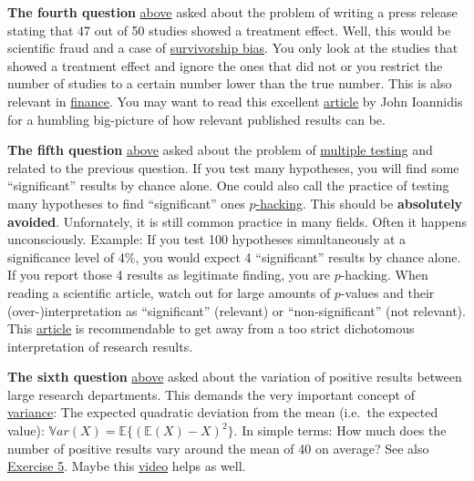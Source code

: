 \documentclass[
]{book}
\begin{document}
\textbf{The fourth question} \hyperref[Questions_about_the_1000-researcher_experiment]{above}
asked about the problem of writing a press release stating that 47 out of 50 studies showed a treatment effect.
Well, this would be scientific fraud and a case of \href{https://en.wikipedia.org/wiki/Survivorship_bias\#:~:text=Survivorship\%20bias\%20or\%20survival\%20bias,conclusions\%20because\%20of\%20incomplete\%20data.}{survivorship bias}.
You only look at the studies that showed a treatment effect and ignore the ones that did not or you restrict the number of studies to a certain number lower than the true number.
This is also relevant in \href{https://www.investopedia.com/terms/s/survivorship-bias-risk.asp\#:~:text=This\%20risk\%20arises\%20from\%20focusing,or\%20removed\%20from\%20performance\%20data.}{finance}.
You may want to read this excellent \href{https://journals.plos.org/plosmedicine/article?id=10.1371/journal.pmed.0020124}{article} by John Ioannidis for a humbling big-picture of how relevant published results can be.

\textbf{The fifth question} \hyperref[Questions_about_the_1000-researcher_experiment]{above}
asked about the problem of \href{https://en.wikipedia.org/wiki/Multiple_comparisons_problem}{multiple testing} and related to the previous question.
If you test many hypotheses, you will find some ``significant'' results by chance alone.
One could also call the practice of testing many hypotheses to find ``significant'' ones \href{https://en.wikipedia.org/wiki/Data_dredging}{\(p\)-hacking}.
This should be \textbf{absolutely avoided}. Unfornately, it is still common practice in many fields. Often it happens unconsciously.
Example: If you test 100 hypotheses simultaneously at a significance level of 4\%, you would expect 4 ``significant'' results by chance alone.
If you report those 4 results as legitimate finding, you are \(p\)-hacking. When reading a scientific article, watch out for large amounts of \(p\)-values and
their (over-)interpretation as ``significant'' (relevant) or ``non-significant'' (not relevant).
This \href{https://www.tandfonline.com/doi/full/10.1080/00031305.2019.1583913}{article} is recommendable to get away from a too strict dichotomous interpretation of research results.

\textbf{The sixth question} \hyperref[Questions_about_the_1000-researcher_experiment]{above}
asked about the variation of positive results between large research departments. This demands the very important concept of \href{https://en.wikipedia.org/wiki/Variance}{variance}:
The expected quadratic deviation from the mean (i.e.~the expected value): \(\mathbb{V}ar(X) = \mathbb{E} \{ (\mathbb{E}(X) - X)^2 \}\). In simple terms:
How much does the number of positive results vary around the mean of 40 on average?
See also \hyperref[exercise5]{Exercise 5}. Maybe this \href{https://www.youtube.com/watch?v=SzZ6GpcfoQY}{video} helps as well.
\end{document}
